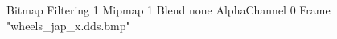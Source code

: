 {Bitmap
	{Filtering 1}
	{Mipmap 1}
	{Blend none}
	{AlphaChannel 0}
	{Frame "wheels_jap_x.dds.bmp"}
}
